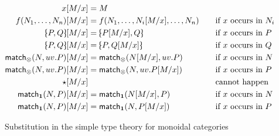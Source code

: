 \documentclass{book}
\def\match{\mathsf{match}}
\def\one{\mathbf{1}}
\def\ott{\mathord{\star}}%
\let\tensor\otimes
\def\tpair#1#2{\text{\textlquill} #1,#2 \text{\textrquill}}%
\begin{document}
\begin{figure}
  \centering
  \begin{alignat*}{2}
    x[M/x] &= M\\
    f(N_1,\dots,N_n)[M/x] &= f(N_1,\dots,N_i[M/x],\dots,N_n) &&\quad\text{if $x$ occurs in $N_i$}\\
    \tpair P Q[M/x] &= \tpair{P[M/x]}{Q} &&\quad\text{if $x$ occurs in $P$}\\
    \tpair P Q[M/x] &= \tpair{P}{Q[M/x]} &&\quad\text{if $x$ occurs in $Q$}\\
    \match_\tensor(N,uv.P)[M/x] &= \match_\tensor(N[M/x],uv.P) &&\quad\text{if $x$ occurs in $N$}\\
    \match_\tensor(N,uv.P)[M/x] &= \match_\tensor(N,uv.P[M/x]) &&\quad\text{if $x$ occurs in $P$}\\
    \ott[M/x] &&&\quad\text{cannot happen}\\
    \match_\one(N,P)[M/x] &= \match_\one(N[M/x],P) &&\quad\text{if $x$ occurs in $N$}\\
    \match_\one(N,P)[M/x] &= \match_\one(N,P[M/x]) &&\quad\text{if $x$ occurs in $P$}
  \end{alignat*}
  \caption{Substitution in the simple type theory for monoidal categories}
  \label{fig:moncat-sub}
\end{figure}
\end{document}
